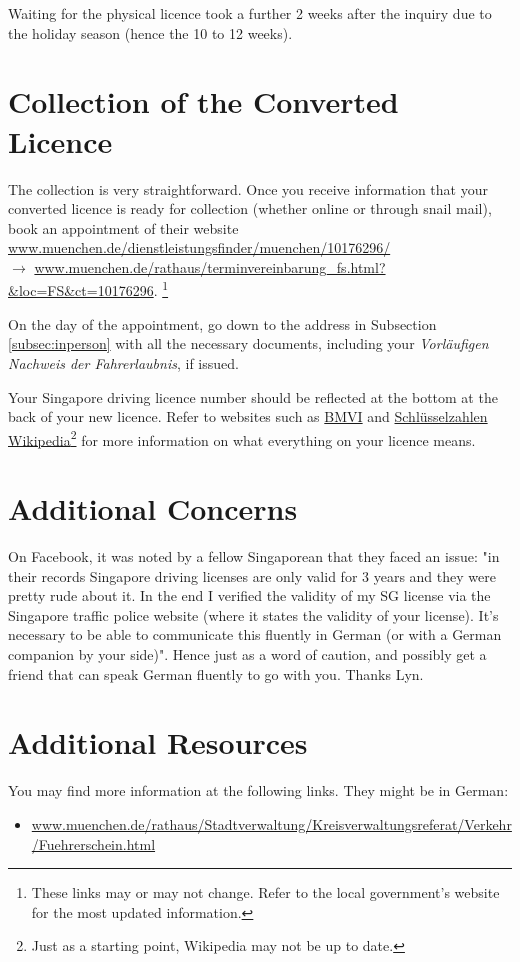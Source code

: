 \documentclass{article}
\newcommand{\de}[1]{\textcolor{NavyBlue}{\textit{#1}}}
\begin{document}
        Waiting for the physical licence took a further 2 weeks after the inquiry due to the holiday season (hence the 10 to 12 weeks).
        
\section{Collection of the Converted Licence}
	The collection is very straightforward. Once you receive information that your converted licence is ready for collection (whether online or through snail mail), book an appointment of their website \\\url{www.muenchen.de/dienstleistungsfinder/muenchen/10176296/} \\$\rightarrow$ \url{www.muenchen.de/rathaus/terminvereinbarung_fs.html?&loc=FS&ct=10176296}. \footnote{These links may or may not change. Refer to the local government's website for the most updated information. }

	On the day of the appointment, go down to the address in Subsection \ref{subsec:inperson} with all the necessary documents, including your \de{Vorläufigen Nachweis der Fahrerlaubnis}, if issued. 	

	Your Singapore driving licence number should be reflected at the bottom at the back of your new licence. Refer to websites such as \href{www.bmvi.de/SharedDocs/EN/Articles/StV/driving-licence-categories-overview.html}{BMVI} and \href{https://de.wikipedia.org/wiki/Schl%C3%BCsselzahlen}{Schlüsselzahlen Wikipedia}\footnote{Just as a starting point, Wikipedia may not be up to date.} for more information on what everything on your licence means. 

\pagebreak

\section{Additional Concerns}
    On Facebook, it was noted by a fellow Singaporean that they faced an issue: "in their records Singapore driving licenses are only valid for 3 years and they were pretty rude about it. In the end I verified the validity of my SG license via the Singapore traffic police website (where it states the validity of your license). It’s necessary to be able to communicate this fluently in German (or with a German companion by your side)". Hence just as a word of caution, and possibly get a friend that can speak German fluently to go with you. Thanks Lyn.
    
\section{Additional Resources}
    You may find more information at the following links. They might be in German:
    \begin{itemize}
        \item \url{www.muenchen.de/rathaus/Stadtverwaltung/Kreisverwaltungsreferat/Verkehr/Fuehrerschein.html}
    \end{itemize}
    
\end{document}
